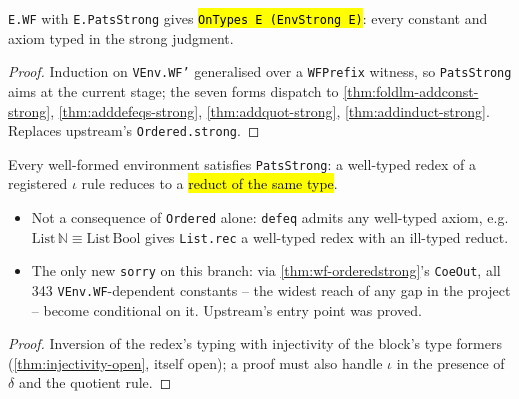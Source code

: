 \begin{theorem}
\label{thm:wf-strong}
\leanok
{}

 \texttt{E.WF} with \texttt{E.PatsStrong} gives \hl{\texttt{OnTypes E
(EnvStrong E)}}: every constant and axiom typed in the strong judgment.
\end{theorem}
\begin{proof}
\leanok
{} Induction on \texttt{VEnv.WF'} generalised over a \texttt{WFPrefix} witness, so
\texttt{PatsStrong} aims at the current stage; the seven forms dispatch to
\ref{thm:foldlm-addconst-strong}, \ref{thm:adddefeqs-strong}, \ref{thm:addquot-strong},
\ref{thm:addinduct-strong}. Replaces upstream's \texttt{Ordered.strong}.
\end{proof}

\begin{theorem}
\label{thm:wf-patsstrong}
\leanok
{}

 Every well-formed environment satisfies \texttt{PatsStrong}: a well-typed
redex of a registered $\iota$ rule reduces to a \hl{reduct of the same type}.
\begin{itemize}
\item Not a consequence of \texttt{Ordered} alone: \texttt{defeq} admits any well-typed
  axiom, e.g. $\mathrm{List}\,\mathbb{N}\equiv\mathrm{List}\,\mathrm{Bool}$ gives
  \texttt{List.rec} a well-typed redex with an ill-typed reduct.
\item {} The only new \texttt{sorry} on this branch: via
  \ref{thm:wf-orderedstrong}'s \texttt{CoeOut}, all 343 \texttt{VEnv.WF}-dependent constants
  -- the widest reach of any gap in the project -- become conditional on it. Upstream's entry
  point was proved.
\end{itemize}
\end{theorem}
\begin{proof}
\stSorry{}  Inversion of the redex's typing with injectivity of the block's
type formers (\ref{thm:injectivity-open}, itself open); a proof must also handle $\iota$ in
the presence of $\delta$ and the quotient rule.
\end{proof}

